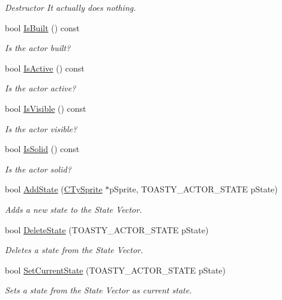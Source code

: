 \begin{DoxyCompactItemize}
\begin{DoxyCompactList}\small\item\em Destructor It actually does nothing. \end{DoxyCompactList}\item 
bool \hyperlink{class_i_ty_actor_af3670099e1c1e77d620c43125dac6e61}{IsBuilt} () const 
\begin{DoxyCompactList}\small\item\em Is the actor built? \end{DoxyCompactList}\item 
bool \hyperlink{class_i_ty_actor_abe293544e0a3823400aaf490b24ae81d}{IsActive} () const 
\begin{DoxyCompactList}\small\item\em Is the actor active? \end{DoxyCompactList}\item 
bool \hyperlink{class_i_ty_actor_a5e3d6f0fd5ab67afb6d56488b7a55595}{IsVisible} () const 
\begin{DoxyCompactList}\small\item\em Is the actor visible? \end{DoxyCompactList}\item 
bool \hyperlink{class_i_ty_actor_a5c1f9e77b0e5903c1f63ac5e2b2c42ad}{IsSolid} () const 
\begin{DoxyCompactList}\small\item\em Is the actor solid? \end{DoxyCompactList}\item 
bool \hyperlink{class_i_ty_actor_aad869e863d1dc2283d7b33bd2aa02e4b}{AddState} (\hyperlink{class_c_ty_sprite}{CTySprite} $\ast$pSprite, TOASTY\_\-ACTOR\_\-STATE pState)
\begin{DoxyCompactList}\small\item\em Adds a new state to the State Vector. \end{DoxyCompactList}\item 
bool \hyperlink{class_i_ty_actor_a64f9104dbcf4bccbc17121d81b40c9cb}{DeleteState} (TOASTY\_\-ACTOR\_\-STATE pState)
\begin{DoxyCompactList}\small\item\em Deletes a state from the State Vector. \end{DoxyCompactList}\item 
bool \hyperlink{class_i_ty_actor_ab7a324bf10f138f537fe2b869d3aeea5}{SetCurrentState} (TOASTY\_\-ACTOR\_\-STATE pState)
\begin{DoxyCompactList}\small\item\em Sets a state from the State Vector as current state. \end{DoxyCompactList}\item 

\end{DoxyCompactItemize}
